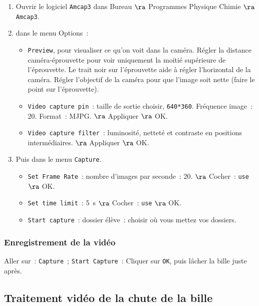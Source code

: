 \documentclass[a4paper, 11pt, final, garamond]{book}
\begin{document}
\begin{enumerate}
    \item Ouvrir le logiciel \texttt{Amcap3} dans Bureau $\ra$ Programmes
        Physique Chimie $\ra$ \texttt{Amcap3}.

    \item dans le menu Options~: 
        \begin{itemize}
            \item \texttt{Preview}, pour visualiser ce qu'on voit dans la
                caméra. Régler la distance caméra-éprouvette pour voir
                uniquement la moitié supérieure de l'éprouvette. Le trait noir
                sur l'éprouvette aide à régler l'horizontal de la caméra. Régler
                l'objectif de la caméra pour que l'image soit nette (faire le
                point sur l'éprouvette).

            \item \texttt{Video capture pin}~: taille de sortie choisir,
                \texttt{640*360}. Fréquence image~: 20. Format~: MJPG.
                $\ra$ Appliquer $\ra$ OK.
            \item \texttt{Video capture filter}~: luminosité, netteté et
                contraste en positions intermédiaires. $\ra$ Appliquer
                $\ra$ OK.
        \end{itemize}
    \item Puis dans le menu \texttt{Capture}.
        \begin{itemize}
            \item \texttt{Set Frame Rate}~: nombre d'images par seconde~: 20.
                $\ra$ Cocher~: \texttt{use} $\ra$ OK.
            \item \texttt{Set time limit}~: \SI{5}{s} $\ra$ Cocher~:
                \texttt{use} $\ra$ OK.
            \item \texttt{Start capture}~: dossier élève~: choisir où vous
                mettez vos dossiers.
        \end{itemize}
\end{enumerate}
 
\subsubsection{Enregistrement de la vidéo}

Aller sur~: \texttt{Capture}~; \texttt{Start Capture}~: Cliquer sur \texttt{OK},
puis lâcher la bille juste après.
 
\subsection{Traitement vidéo de la chute de la bille}
\end{document}
